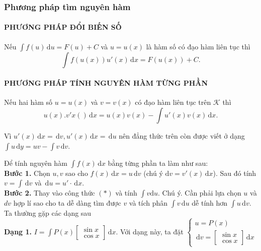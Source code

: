 \subsubsection{Phương pháp tìm nguyên hàm}
\paragraph{PHƯƠNG PHÁP ĐỔI BIẾN SỐ}

	\begin{dl}
		Nếu $\displaystyle\int {f(u) \mathrm{\,d}u} = F(u) + C$ và $u =u(x)$ là hàm số có đạo hàm liên tục thì $$\displaystyle \int {f(u(x)) u'(x) \mathrm{\,d}x} = F(u(x)) +C.$$
	\end{dl}
\paragraph{PHƯƠNG PHÁP TÍNH NGUYÊN HÀM TỪNG PHẦN}
	\begin{dl}
		Nếu hai hàm số $u = u(x)$ và $v = v(x)$ có đạo hàm liên tục trên $\mathscr{K}$ thì $$\displaystyle {u(x).v'x()} \mathrm{\,d}x = u(x)v(x) - \displaystyle\int{u'(x)v(x)} \mathrm{\,d}x.$$
	\end{dl}
	\begin{note}
		Vì $u'(x) \mathrm{\,d}x = \mathrm{\,d}v, u'(x) \mathrm{\,d}x = \mathrm{\,d}u$ nên đẳng thức trên còn được viết ở dạng $\displaystyle \int {u} \mathrm{\,d}y = uv - \displaystyle \int{v} \mathrm{\,d}v$.
	\end{note}
	Để tính nguyên hàm $\displaystyle\int{f\left(x\right)}  \mathrm{\,d}x$ bằng từng phần ta làm như sau:\\
	\textbf{Bước 1.} Chọn $u,  v$ sao cho $f\left(x\right) \mathrm{\,d}x=u \mathrm{\,d}v$ (chú ý $ \mathrm{d}v=v'\left(x\right) \mathrm{\,d}x$). 
	Sau đó tính $v=\displaystyle\int{\mathrm{\,d}v}$ và $ \mathrm{\,d}u=u' \cdot \mathrm{\,d}x$.\\
	\textbf{Bước 2.} Thay vào công thức $\left(*\right)$ và tính $\displaystyle\int{v \mathrm{d}u}$.
	Chú ý. Cần phải lựa chọn $u$ và $dv$ hợp lí sao cho ta dễ dàng tìm được $v$ và tích phân $\displaystyle\int{v \mathrm{\,d}u}$ dễ tính hơn $\displaystyle\int{u \mathrm{\,d}v}$. Ta thường gặp các dạng sau\\
\textbf{Dạng 1.} $I = \displaystyle\int {P\left( x \right)\left[ \begin{array}{l} 	\sin x\\ 	\cos x  	\end{array} \right]{\mathrm{\,d}}x} $. Với dạng này, ta đặt $\left\{ \begin{array}{l}  u = P\left( x \right)\\  {\mathrm{\,d}}v = \left[ \begin{array}{l} \sin x\\ \cos x \end{array} \right]\mathrm{\,d}x \end{array} \right.$ \\
